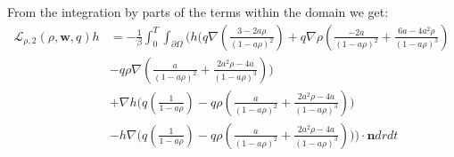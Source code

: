 \documentclass[11pt, a4paper]{article}
\theoremstyle{definition}
\newcommand{\w}{\mathbf{w}}
\newcommand{\n}{\mathbf{n}}
\begin{document}
From the integration by parts of the terms within the domain we get:
\begin{align*}
	\mathcal{L}_{\rho,2}(\rho, \w,q)h &= - \frac{1}{\beta}\int_0^T \int_{\partial \Omega} \bigg(h \bigg( q  \nabla \left( \frac{3-2a\rho}{(1-a\rho)^2} \right) + q \nabla \rho  \left( \frac{-2a }{(1-a\rho)^2} + \frac{6a-4a^2  \rho}{(1-a\rho)^3}  \right)\\
	&- q\rho \nabla \left(\frac{a }{(1-a\rho)^2} + \frac{2a^2\rho -4a}{(1-a\rho)^3} \right) \bigg)\\
	& + \nabla h \bigg(q \left(\frac{1}{1- a\rho} \right)  - q\rho  \left(\frac{a }{(1-a\rho)^2} + \frac{2a^2\rho -4a}{(1-a\rho)^3} \right)  \bigg) \\
	&- h \nabla \bigg(q \left(\frac{1}{1- a\rho} \right)  - q\rho  \left(\frac{a }{(1-a\rho)^2} + \frac{2a^2\rho -4a}{(1-a\rho)^3} \right)  \bigg) \bigg)\cdot \n dr dt
\end{align*}
\end{document}
